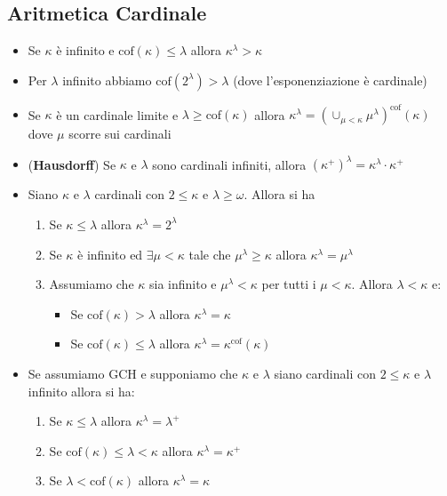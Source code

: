 \documentclass[a4paper,NoNotes,GeneralMath]{stdmdoc}
\newcommand{\cof}[1]{\text{cof}({#1})}
\begin{document}
	\subsection*{Aritmetica Cardinale}
	\begin{itemize}
		\item Se $\kappa$ è infinito e $\cof{\kappa} \le \lambda$ allora $\kappa^\lambda > \kappa$
		\item Per $\lambda$ infinito abbiamo $\cof{2^\lambda} > \lambda$ (dove l'esponenziazione è cardinale)
		\item Se $\kappa$ è un cardinale limite e $\lambda \ge \cof{\kappa}$ allora $\kappa^\lambda = {\left( \cup_{\mu < \kappa} \mu^\lambda \right)}^\cof{\kappa}$ dove $\mu$ scorre sui cardinali
		\item ({\bf Hausdorff}) Se $\kappa$ e $\lambda$ sono cardinali infiniti, allora $(\kappa^+)^\lambda = \kappa^\lambda \cdot \kappa^+$
		\item Siano $\kappa$ e $\lambda$ cardinali con $2 \le \kappa$ e $\lambda \ge \omega$. Allora si ha
			\begin{enumerate}
				\item Se $\kappa \le \lambda$ allora $\kappa^\lambda = 2^\lambda$
				\item Se $\kappa$ è infinito ed $\exists \mu < \kappa$ tale che $\mu^\lambda \ge \kappa$ allora $\kappa^\lambda = \mu^\lambda$
				\item Assumiamo che $\kappa$ sia infinito e $\mu^\lambda < \kappa$ per tutti i $\mu < \kappa$. Allora $\lambda < \kappa$ e:
					\begin{itemize}
						\item Se $\cof{\kappa} > \lambda$ allora $\kappa^\lambda = \kappa$
						\item Se $\cof{\kappa} \le \lambda$ allora $\kappa^\lambda = \kappa^\cof{\kappa}$
					\end{itemize}
			\end{enumerate}
		\item Se assumiamo GCH e supponiamo che $\kappa$ e $\lambda$ siano cardinali con $2 \le \kappa$ e $\lambda$ infinito allora si ha:
			\begin{enumerate}
				\item Se $\kappa \le \lambda$ allora $\kappa^\lambda = \lambda^+$
				\item Se $\cof{\kappa} \le \lambda < \kappa$ allora $\kappa^\lambda = \kappa^+$
				\item Se $\lambda < \cof{\kappa}$ allora $\kappa^\lambda = \kappa$
			\end{enumerate}
	\end{itemize}
	
\end{document}
